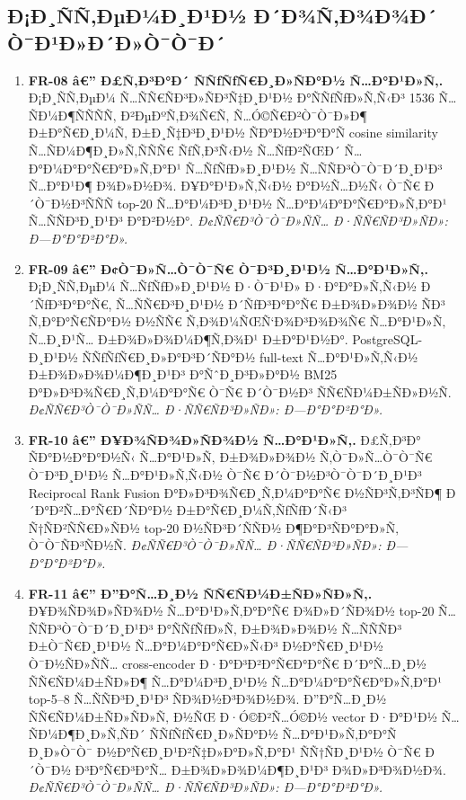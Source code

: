\documentclass[12pt,A4]{report}
\begin{document}
\subsection{Ð¡Ð¸ÑÑ‚ÐµÐ¼Ð¸Ð¹Ð½ Ð´Ð¾Ñ‚Ð¾Ð¾Ð´ Ò¯Ð¹Ð»Ð´Ð»Ò¯Ò¯Ð´}

\begin{enumerate}

  \item \textbf{FR-08 â€” Ð£Ñ‚Ð³Ð°Ð´ ÑÑƒÑƒÑ€Ð¸Ð»ÑÐ°Ð½ Ñ…Ð°Ð¹Ð»Ñ‚.}
        Ð¡Ð¸ÑÑ‚ÐµÐ¼ Ñ…ÑÑ€ÑÐ³Ð»ÑÐ³Ñ‡Ð¸Ð¹Ð½ Ð°ÑÑƒÑƒÐ»Ñ‚Ñ‹Ð³ 1536 Ñ…ÑÐ¼Ð¶ÑÑÑÑ‚
        Ð²ÐµÐºÑ‚Ð¾Ñ€Ñ‚ Ñ…Ó©Ñ€Ð²Ò¯Ò¯Ð»Ð¶ Ð±Ð°Ñ€Ð¸Ð¼Ñ‚ Ð±Ð¸Ñ‡Ð³Ð¸Ð¹Ð½ ÑÐ°Ð½Ð³Ð°Ð°Ñ cosine
        similarity Ñ…ÑÐ¼Ð¶Ð¸Ð»Ñ‚ÑÑÑ€ ÑƒÑ‚Ð³Ñ‹Ð½ Ñ…ÑƒÐ²ÑŒÐ´
        Ñ…Ð°Ð¼Ð°Ð°Ñ€Ð°Ð»Ñ‚Ð°Ð¹ Ñ…ÑƒÑƒÐ»Ð¸Ð¹Ð½ Ñ…ÑÑÐ³Ò¯Ò¯Ð´Ð¸Ð¹Ð³ Ñ…Ð°Ð¹Ð¶ Ð¾Ð»Ð½Ð¾.
        Ð¥Ð°Ð¹Ð»Ñ‚Ñ‹Ð½ Ð°Ð½Ñ…Ð½Ñ‹ Ò¯Ñ€ Ð´Ò¯Ð½Ð³ÑÑÑ top-20 Ñ…Ð°Ð¼Ð³Ð¸Ð¹Ð½
        Ñ…Ð°Ð¼Ð°Ð°Ñ€Ð°Ð»Ñ‚Ð°Ð¹ Ñ…ÑÑÐ³Ð¸Ð¹Ð³ Ð°Ð²Ð½Ð°.
        \textit{Ð¢ÑÑ€Ð³Ò¯Ò¯Ð»ÑÑ… Ð·ÑÑ€ÑÐ³Ð»ÑÐ»: Ð—Ð°Ð°Ð²Ð°Ð».}

  \item \textbf{FR-09 â€” Ð¢Ò¯Ð»Ñ…Ò¯Ò¯Ñ€ Ò¯Ð³Ð¸Ð¹Ð½ Ñ…Ð°Ð¹Ð»Ñ‚.}
        Ð¡Ð¸ÑÑ‚ÐµÐ¼ Ñ…ÑƒÑƒÐ»Ð¸Ð¹Ð½ Ð·Ò¯Ð¹Ð» Ð·Ð°Ð°Ð»Ñ‚Ñ‹Ð½ Ð´ÑƒÐ³Ð°Ð°Ñ€, Ñ…ÑÑ€Ð³Ð¸Ð¹Ð½
        Ð´ÑƒÐ³Ð°Ð°Ñ€ Ð±Ð¾Ð»Ð¾Ð½ ÑÐ³ Ñ‚Ð°Ð°Ñ€ÑÐ°Ð½ Ð½ÑÑ€ Ñ‚Ð¾Ð¼ÑŒÑ‘Ð¾Ð³Ð¾Ð¾Ñ€ Ñ…Ð°Ð¹Ð»Ñ‚
        Ñ…Ð¸Ð¹Ñ… Ð±Ð¾Ð»Ð¾Ð¼Ð¶Ñ‚Ð¾Ð¹ Ð±Ð°Ð¹Ð½Ð°. PostgreSQL-Ð¸Ð¹Ð½ ÑÑƒÑƒÑ€Ð¸Ð»Ð°Ð³Ð´ÑÐ°Ð½
        full-text Ñ…Ð°Ð¹Ð»Ñ‚Ñ‹Ð½ Ð±Ð¾Ð»Ð¾Ð¼Ð¶Ð¸Ð¹Ð³ Ð°ÑˆÐ¸Ð³Ð»Ð°Ð½ BM25
        Ð°Ð»Ð³Ð¾Ñ€Ð¸Ñ‚Ð¼Ð°Ð°Ñ€ Ò¯Ñ€ Ð´Ò¯Ð½Ð³ ÑÑ€ÑÐ¼Ð±ÑÐ»Ð½Ñ.
        \textit{Ð¢ÑÑ€Ð³Ò¯Ò¯Ð»ÑÑ… Ð·ÑÑ€ÑÐ³Ð»ÑÐ»: Ð—Ð°Ð°Ð²Ð°Ð».}

  \item \textbf{FR-10 â€” Ð¥Ð¾ÑÐ¾Ð»ÑÐ¾Ð½ Ñ…Ð°Ð¹Ð»Ñ‚.}
        Ð£Ñ‚Ð³Ð° ÑÐ°Ð½Ð°Ð°Ð½Ñ‹ Ñ…Ð°Ð¹Ð»Ñ‚ Ð±Ð¾Ð»Ð¾Ð½ Ñ‚Ò¯Ð»Ñ…Ò¯Ò¯Ñ€ Ò¯Ð³Ð¸Ð¹Ð½ Ñ…Ð°Ð¹Ð»Ñ‚Ñ‹Ð½
        Ò¯Ñ€ Ð´Ò¯Ð½Ð³Ò¯Ò¯Ð´Ð¸Ð¹Ð³ Reciprocal Rank Fusion Ð°Ð»Ð³Ð¾Ñ€Ð¸Ñ‚Ð¼Ð°Ð°Ñ€
        Ð½ÑÐ³Ñ‚Ð³ÑÐ¶ Ð´Ð°Ð²Ñ…Ð°Ñ€Ð´ÑÐ°Ð½ Ð±Ð°Ñ€Ð¸Ð¼Ñ‚ÑƒÑƒÐ´Ñ‹Ð³ Ñ†ÑÐ²ÑÑ€Ð»ÑÐ½
        top-20 Ð½ÑÐ³Ð´ÑÑÐ½ Ð¶Ð°Ð³ÑÐ°Ð°Ð»Ñ‚ Ò¯Ò¯ÑÐ³ÑÐ½Ñ.
        \textit{Ð¢ÑÑ€Ð³Ò¯Ò¯Ð»ÑÑ… Ð·ÑÑ€ÑÐ³Ð»ÑÐ»: Ð—Ð°Ð°Ð²Ð°Ð».}

  \item \textbf{FR-11 â€” Ð”Ð°Ñ…Ð¸Ð½ ÑÑ€ÑÐ¼Ð±ÑÐ»ÑÐ»Ñ‚.}
        Ð¥Ð¾ÑÐ¾Ð»ÑÐ¾Ð½ Ñ…Ð°Ð¹Ð»Ñ‚Ð°Ð°Ñ€ Ð¾Ð»Ð´ÑÐ¾Ð½ top-20 Ñ…ÑÑÐ³Ò¯Ò¯Ð´Ð¸Ð¹Ð³
        Ð°ÑÑƒÑƒÐ»Ñ‚ Ð±Ð¾Ð»Ð¾Ð½ Ñ…ÑÑÑÐ³ Ð±Ò¯Ñ€Ð¸Ð¹Ð½ Ñ…Ð°Ð¼Ð°Ð°Ñ€Ð»Ñ‹Ð³ Ð½Ð°Ñ€Ð¸Ð¹Ð½
        Ò¯Ð½ÑÐ»ÑÑ… cross-encoder Ð·Ð°Ð³Ð²Ð°Ñ€Ð°Ð°Ñ€ Ð´Ð°Ñ…Ð¸Ð½ ÑÑ€ÑÐ¼Ð±ÑÐ»Ð¶
        Ñ…Ð°Ð¼Ð³Ð¸Ð¹Ð½ Ñ…Ð°Ð¼Ð°Ð°Ñ€Ð°Ð»Ñ‚Ð°Ð¹ top-5--8 Ñ…ÑÑÐ³Ð¸Ð¹Ð³ ÑÐ¾Ð½Ð³Ð¾Ð½Ð¾.
        Ð”Ð°Ñ…Ð¸Ð½ ÑÑ€ÑÐ¼Ð±ÑÐ»ÑÐ»Ñ‚ Ð½ÑŒ Ð·Ó©Ð²Ñ…Ó©Ð½ vector Ð·Ð°Ð¹Ð½
        Ñ…ÑÐ¼Ð¶Ð¸Ð»Ñ‚ÑÐ´ ÑÑƒÑƒÑ€Ð¸Ð»ÑÐ°Ð½ Ñ…Ð°Ð¹Ð»Ñ‚Ð°Ð°Ñ Ð¸Ð»Ò¯Ò¯ Ð½Ð°Ñ€Ð¸Ð¹Ð²Ñ‡Ð»Ð°Ð»Ñ‚Ð°Ð¹
        ÑÑ†ÑÐ¸Ð¹Ð½ Ò¯Ñ€ Ð´Ò¯Ð½ Ð³Ð°Ñ€Ð³Ð°Ñ… Ð±Ð¾Ð»Ð¾Ð¼Ð¶Ð¸Ð¹Ð³ Ð¾Ð»Ð³Ð¾Ð½Ð¾.
        \textit{Ð¢ÑÑ€Ð³Ò¯Ò¯Ð»ÑÑ… Ð·ÑÑ€ÑÐ³Ð»ÑÐ»: Ð—Ð°Ð°Ð²Ð°Ð».}


\end{enumerate}
\end{document}
